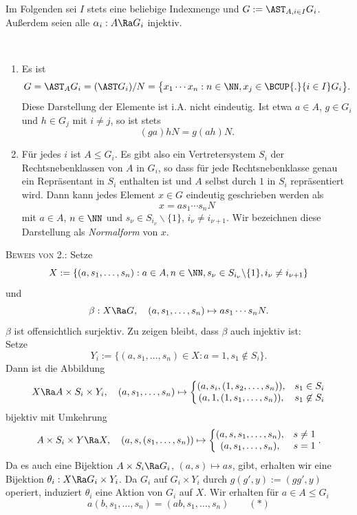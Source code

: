 Im Folgenden sei $I$ stets eine beliebige Indexmenge und
$G:=\AST_{A,i\in I} G_i$. Außerdem seien alle
$\alpha_i:A\Ra G_i$ injektiv.

\DB\label{bem_NF} \
\begin{enumerate}
\item Es ist
\[
G = \AST_A G_i = (\AST G_i)/N
=\bigl\{x_1\cdots x_n : n\in\NN, x_j\in\BCUP{.}{i\in I} G_i \bigr\}.
\]
Diese Darstellung der Elemente ist i.A. nicht eindeutig.
Ist etwa $a\in A$, $g\in G_i$ und $h\in G_j$ mit $i\neq j$, so
ist stets
\[
(ga)hN = g(ah)N.
\]
\item Für jedes $i$ ist $A\leq G_i$. Es gibt also ein Vertretersystem
$S_i$ der Rechtsnebenklassen von $A$ in $G_i$, so
dass für jede Rechtsnebenklasse genau ein Repräsentant
in $S_i$ enthalten ist und $A$ selbst durch $1$ in $S_i$ repräsentiert
wird.
Dann kann jedes Element $x\in G$ eindeutig geschrieben werden
als
\[
x = as_1\cdots s_n N
\]
mit $a\in A$, $n\in\NN$ und $s_{\nu}\in S_{i_{\nu}}\backslash\{1\}$,
$i_{\nu}\neq i_{\nu+1}$.
Wir bezeichnen diese Darstellung als \emph{Normalform} von $x$.
\end{enumerate}
\textsc{Beweis von 2.:}
Setze
\[
X :=
\{ (a,s_1,\ldots,s_n): a\in A, n\in\NN,
s_{\nu}\in S_{i_{\nu}}\backslash\{1\},
i_{\nu}\neq i_{\nu+1} \}
\]
und
\[
\beta:X\Ra G,\quad (a,s_1,\ldots,s_n)\mapsto a s_1\cdots s_n N.
\]
$\beta$ ist offensichtlich surjektiv. Zu zeigen bleibt,
dass $\beta$ auch injektiv ist:\\
Setze
\[
Y_i :=
\{ (a,s_1,\ldots,s_n)\in X : a=1, s_1\not\in S_i \}.
\]
Dann ist die Abbildung
\[
X\Ra A\times S_i\times Y_i,\quad
(a,s_1,\ldots,s_n)\mapsto \left\{
\begin{matrix}
(a,s_i,(1,s_2,\ldots,s_n)), & s_1\in S_i \\
(a,1,(1,s_1,\ldots,s_n)), & s_1\not\in S_i
\end{matrix}
\right.
\]
bijektiv mit Umkehrung
\[
A\times S_i\times Y \Ra X,\quad
(a,s,(s_1,\ldots,s_n))\mapsto \left\{
\begin{matrix}
(a,s,s_1,\ldots,s_n), & s \neq 1 \\
(a,s_1,\ldots,s_n), & s = 1
\end{matrix}
\right..
\]
Da es auch eine Bijektion
$A\times S_i \Ra G_i$, $(a,s)\mapsto as$, gibt,
erhalten wir eine Bijektion
$\theta_i:X\Ra G_i\times Y_i$.
Da $G_i$ auf $G_i\times Y_i$ durch $g(g',y):=(gg',y)$ operiert,
induziert $\theta_i$ eine Aktion von $G_i$ auf $X$.
Wir erhalten für $a\in A\leq G_i$
\[
a(b,s_1,\ldots,s_n) = (ab,s_1,\ldots,s_n)\qquad (*)
\]
